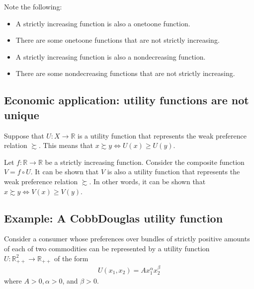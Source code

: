 \documentclass[letterpaper,10pt,english]{jupyterBook}
\begin{document}
\sphinxAtStartPar
Note the following:
\begin{itemize}
\item {} 
\sphinxAtStartPar
A strictly increasing function is also a one\sphinxhyphen{}to\sphinxhyphen{}one function.

\item {} 
\sphinxAtStartPar
There are some one\sphinxhyphen{}to\sphinxhyphen{}one functions that are not strictly increasing.

\item {} 
\sphinxAtStartPar
A strictly increasing function is also a non\sphinxhyphen{}decreasing function.

\item {} 
\sphinxAtStartPar
There are some non\sphinxhyphen{}decreasing functions that are not strictly increasing.

\end{itemize}


\subsection{Economic application: utility functions are not unique}
\label{\detokenize{03.mappings_functions_correspondences:economic-application-utility-functions-are-not-unique}}
\sphinxAtStartPar
Suppose that \(U : X \rightarrow \mathbb{R}\) is a utility function that represents the weak preference relation \(\succsim\). This means that \(x \succsim y \iff U(x) \geqslant U(y)\).

\sphinxAtStartPar
Let \(f: \mathbb{R} \rightarrow \mathbb{R}\) be a strictly increasing function. Consider the composite function \(V = f \circ U\). It can be shown that \(V\) is also a utility function that represents the weak preference relation \(\succsim\). In other words, it can be shown that \(x \succsim y \iff V(x) \geqslant V(y)\).


\subsection{Example: A Cobb\sphinxhyphen{}Douglas utility function}
\label{\detokenize{03.mappings_functions_correspondences:example-a-cobb-douglas-utility-function}}
\sphinxAtStartPar
Consider a consumer whose preferences over bundles of strictly positive amounts of each of two commodities can be represented by a utility function \(U : \mathbb{R}^2_{++} \rightarrow \mathbb{R}_{++}\) of the form
\begin{equation*}
\begin{split}U(x_1, x_2) = Ax_1^\alpha x_2^\beta\end{split}
\end{equation*}
\sphinxAtStartPar
where \(A > 0, \alpha > 0\), and \(\beta > 0\).
\end{document}
